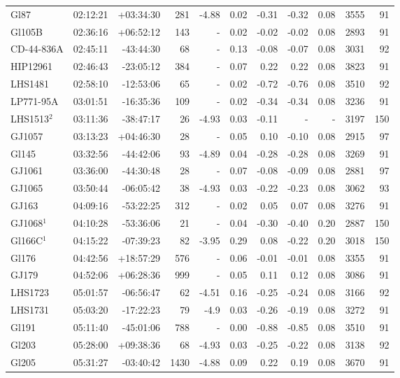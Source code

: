 \documentclass{aa}
\begin{document}
{\begin{longtable}{l r r r r r r r r r r}
Gl87 & 02:12:21 & +03:34:30 & 281 & -4.88 & 0.02 & -0.31 & -0.32 & 0.08 & 3555 &   91 \\
Gl105B & 02:36:16 & +06:52:12 & 143 &    - & 0.02 & -0.02 & -0.02 & 0.08 & 2893 &   91 \\
CD-44-836A & 02:45:11 & -43:44:30 & 68 &    - & 0.13 & -0.08 & -0.07 & 0.08 & 3031 &   92 \\
HIP12961 & 02:46:43 & -23:05:12 & 384 &    - & 0.07 & 0.22 & 0.22 & 0.08 & 3823 &   91 \\
LHS1481 & 02:58:10 & -12:53:06 & 65 &    - & 0.02 & -0.72 & -0.76 & 0.08 & 3510 &   92 \\
LP771-95A & 03:01:51 & -16:35:36 & 109 &    - & 0.02 & -0.34 & -0.34 & 0.08 & 3236 &   91 \\
LHS1513$^2$ & 03:11:36 & -38:47:17 & 26 & -4.93 & 0.03 & -0.11 & - & - &  3197 &  150 \\
GJ1057 & 03:13:23 & +04:46:30 & 28 &    - & 0.05 & 0.10 & -0.10 & 0.08 & 2915 &   97 \\
Gl145 & 03:32:56 & -44:42:06 & 93 & -4.89 & 0.04 & -0.28 & -0.28 & 0.08 & 3269 &   91 \\
GJ1061 & 03:36:00 & -44:30:48 & 28 &    - & 0.07 & -0.08 & -0.09 & 0.08 & 2881 &   97 \\
GJ1065 & 03:50:44 & -06:05:42 & 38 & -4.93 & 0.03 & -0.22 & -0.23 & 0.08 & 3062 &   93 \\
GJ163 & 04:09:16 & -53:22:25 & 312 &    - & 0.02 & 0.05 & 0.07 & 0.08 & 3276 &   91 \\
GJ1068$^1$ & 04:10:28 & -53:36:06 & 21 &    - & 0.04 & -0.30 & -0.40 & 0.20 & 2887 &  150 \\
Gl166C$^1$ & 04:15:22 & -07:39:23 & 82 & -3.95 & 0.29 & 0.08 & -0.22 & 0.20 & 3018 &  150 \\
Gl176 & 04:42:56 & +18:57:29 & 576 &    - & 0.06 & -0.01 & -0.01 & 0.08 & 3355 &   91 \\
GJ179 & 04:52:06 & +06:28:36 & 999 &    - & 0.05 & 0.11 & 0.12 & 0.08 & 3086 &   91 \\
LHS1723 & 05:01:57 & -06:56:47 & 62 & -4.51 & 0.16 & -0.25 & -0.24 & 0.08 & 3166 &   92 \\
LHS1731 & 05:03:20 & -17:22:23 & 79 & -4.9 & 0.03 & -0.26 & -0.19 & 0.08 & 3272 &   91 \\
Gl191 & 05:11:40 & -45:01:06 & 788 &    - & 0.00 & -0.88 & -0.85 & 0.08 & 3510 &   91 \\
Gl203 & 05:28:00 & +09:38:36 & 68 & -4.93 & 0.03 & -0.25 & -0.22 & 0.08 & 3138 &   92 \\
Gl205 & 05:31:27 & -03:40:42 & 1430 & -4.88 & 0.09 & 0.22 & 0.19 & 0.08 & 3670 &   91 \\

\end{longtable}}
\end{document}
